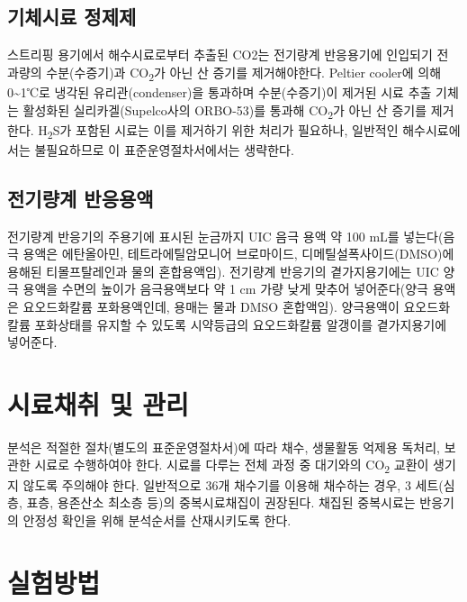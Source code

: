 \documentclass[
]{book}
\begin{document}
\hypertarget{uxae30uxccb4uxc2dcuxb8cc-uxc815uxc81cuxc81c}{%
\subsection{기체시료 정제제}\label{uxae30uxccb4uxc2dcuxb8cc-uxc815uxc81cuxc81c}}

스트리핑 용기에서 해수시료로부터 추출된 CO2는 전기량계 반응용기에 인입되기 전 과량의 수분(수증기)과 CO\textsubscript{2}가 아닌 산 증기를 제거해야한다. Peltier cooler에 의해 0\textasciitilde1℃로 냉각된 유리관(condenser)을 통과하며 수분(수증기)이 제거된 시료 추출 기체는 활성화된 실리카겔(Supelco사의 ORBO-53)를 통과해 CO\textsubscript{2}가 아닌 산 증기를 제거한다.
H\textsubscript{2}S가 포함된 시료는 이를 제거하기 위한 처리가 필요하나, 일반적인 해수시료에서는 불필요하므로 이 표준운영절차서에서는 생략한다.

\hypertarget{uxc804uxae30uxb7c9uxacc4-uxbc18uxc751uxc6a9uxc561}{%
\subsection{전기량계 반응용액}\label{uxc804uxae30uxb7c9uxacc4-uxbc18uxc751uxc6a9uxc561}}

전기량계 반응기의 주용기에 표시된 눈금까지 UIC 음극 용액 약 100 mL를 넣는다(음극 용액은 에탄올아민, 테트라에틸암모니어 브로마이드, 디메틸설폭사이드(DMSO)에 용해된 티몰프탈레인과 물의 혼합용액임). 전기량계 반응기의 곁가지용기에는 UIC 양극 용액을 수면의 높이가 음극용액보다 약 1 cm 가량 낮게 맞추어 넣어준다(양극 용액은 요오드화칼륨 포화용액인데, 용매는 물과 DMSO 혼합액임). 양극용액이 요오드화칼륨 포화상태를 유지할 수 있도록 시약등급의 요오드화칼륨 알갱이를 곁가지용기에 넣어준다.

\hypertarget{uxc2dcuxb8ccuxcc44uxcde8-uxbc0f-uxad00uxb9ac-2}{%
\section{시료채취 및 관리}\label{uxc2dcuxb8ccuxcc44uxcde8-uxbc0f-uxad00uxb9ac-2}}

분석은 적절한 절차(별도의 표준운영절차서)에 따라 채수, 생물활동 억제용 독처리, 보관한 시료로 수행하여야 한다. 시료를 다루는 전체 과정 중 대기와의 CO\textsubscript{2} 교환이 생기지 않도록 주의해야 한다. 일반적으로 36개 채수기를 이용해 채수하는 경우, 3 세트(심층, 표층, 용존산소 최소층 등)의 중복시료채집이 권장된다. 채집된 중복시료는 반응기의 안정성 확인을 위해 분석순서를 산재시키도록 한다.

\hypertarget{uxc2e4uxd5d8uxbc29uxbc95}{%
\section{실험방법}\label{uxc2e4uxd5d8uxbc29uxbc95}}
\end{document}
